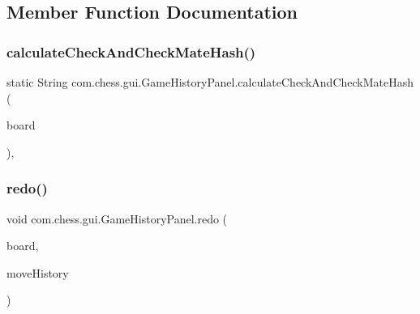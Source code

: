 \subsection{Member Function Documentation}
\mbox{\label{classcom_1_1chess_1_1gui_1_1_game_history_panel_a85ee21afff46e7612d25a4e388b8e98a}} 
\subsubsection{\texorpdfstring{calculateCheckAndCheckMateHash()}{calculateCheckAndCheckMateHash()}}
{\footnotesize\ttfamily static String com.\+chess.\+gui.\+Game\+History\+Panel.\+calculate\+Check\+And\+Check\+Mate\+Hash (\begin{DoxyParamCaption}\item[{final \mbox{\hyperlink{classcom_1_1chess_1_1engine_1_1classic_1_1board_1_1_board}{Board}}}]{board }\end{DoxyParamCaption})\hspace{0.3cm}{\ttfamily [static]}, {\ttfamily [private]}}

\mbox{\label{classcom_1_1chess_1_1gui_1_1_game_history_panel_a378b38f2216765cf13f05faa2a208631}} 
\subsubsection{\texorpdfstring{redo()}{redo()}}
{\footnotesize\ttfamily void com.\+chess.\+gui.\+Game\+History\+Panel.\+redo (\begin{DoxyParamCaption}\item[{final \mbox{\hyperlink{classcom_1_1chess_1_1engine_1_1classic_1_1board_1_1_board}{Board}}}]{board,  }\item[{final \mbox{\hyperlink{classcom_1_1chess_1_1gui_1_1_table_1_1_move_log}{Move\+Log}}}]{move\+History }\end{DoxyParamCaption})\hspace{0.3cm}{\ttfamily [package]}}



